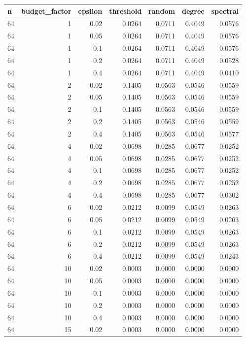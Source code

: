 \begin{table}[t]
\centering
\begin{tabular}{lrrrrrr}
\hline
n & budget\_factor & epsilon & threshold & random & degree & spectral \\
\hline
64 & 1 & 0.02 & 0.0264 & 0.0711 & 0.4049 & 0.0576 \\
64 & 1 & 0.05 & 0.0264 & 0.0711 & 0.4049 & 0.0576 \\
64 & 1 & 0.1 & 0.0264 & 0.0711 & 0.4049 & 0.0576 \\
64 & 1 & 0.2 & 0.0264 & 0.0711 & 0.4049 & 0.0528 \\
64 & 1 & 0.4 & 0.0264 & 0.0711 & 0.4049 & 0.0410 \\
64 & 2 & 0.02 & 0.1405 & 0.0563 & 0.0546 & 0.0559 \\
64 & 2 & 0.05 & 0.1405 & 0.0563 & 0.0546 & 0.0559 \\
64 & 2 & 0.1 & 0.1405 & 0.0563 & 0.0546 & 0.0559 \\
64 & 2 & 0.2 & 0.1405 & 0.0563 & 0.0546 & 0.0559 \\
64 & 2 & 0.4 & 0.1405 & 0.0563 & 0.0546 & 0.0577 \\
64 & 4 & 0.02 & 0.0698 & 0.0285 & 0.0677 & 0.0252 \\
64 & 4 & 0.05 & 0.0698 & 0.0285 & 0.0677 & 0.0252 \\
64 & 4 & 0.1 & 0.0698 & 0.0285 & 0.0677 & 0.0252 \\
64 & 4 & 0.2 & 0.0698 & 0.0285 & 0.0677 & 0.0252 \\
64 & 4 & 0.4 & 0.0698 & 0.0285 & 0.0677 & 0.0302 \\
64 & 6 & 0.02 & 0.0212 & 0.0099 & 0.0549 & 0.0263 \\
64 & 6 & 0.05 & 0.0212 & 0.0099 & 0.0549 & 0.0263 \\
64 & 6 & 0.1 & 0.0212 & 0.0099 & 0.0549 & 0.0263 \\
64 & 6 & 0.2 & 0.0212 & 0.0099 & 0.0549 & 0.0263 \\
64 & 6 & 0.4 & 0.0212 & 0.0099 & 0.0549 & 0.0243 \\
64 & 10 & 0.02 & 0.0003 & 0.0000 & 0.0000 & 0.0000 \\
64 & 10 & 0.05 & 0.0003 & 0.0000 & 0.0000 & 0.0000 \\
64 & 10 & 0.1 & 0.0003 & 0.0000 & 0.0000 & 0.0000 \\
64 & 10 & 0.2 & 0.0003 & 0.0000 & 0.0000 & 0.0000 \\
64 & 10 & 0.4 & 0.0003 & 0.0000 & 0.0000 & 0.0000 \\
64 & 15 & 0.02 & 0.0003 & 0.0000 & 0.0000 & 0.0000 \\

\end{tabular}
\end{table}
